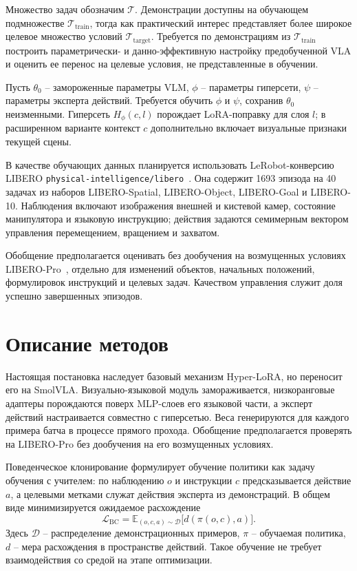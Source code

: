 \documentclass{misisarticle}
\begin{document}
Множество задач обозначим $\mathcal{T}$. Демонстрации доступны на обучающем подмножестве $\mathcal{T}_{\mathrm{train}}$, тогда как практический интерес представляет более широкое целевое множество условий $\mathcal{T}_{\mathrm{target}}$. Требуется по демонстрациям из $\mathcal{T}_{\mathrm{train}}$ построить параметрически- и данно-эффективную настройку предобученной VLA и оценить ее перенос на целевые условия, не представленные в обучении.

Пусть $\theta_0$ -- замороженные параметры VLM, $\phi$ -- параметры гиперсети, $\psi$ -- параметры эксперта действий. Требуется обучить $\phi$ и $\psi$, сохранив $\theta_0$ неизменными. Гиперсеть $H_\phi(c,l)$ порождает LoRA-поправку для слоя $l$; в расширенном варианте контекст $c$ дополнительно включает визуальные признаки текущей сцены.

В качестве обучающих данных планируется использовать LeRobot-конверсию LIBERO \texttt{physical-intelligence/libero}~\cite{libero,liberodata}. Она содержит 1693 эпизода на 40 задачах из наборов LIBERO-Spatial, LIBERO-Object, LIBERO-Goal и LIBERO-10. Наблюдения включают изображения внешней и кистевой камер, состояние манипулятора и языковую инструкцию; действия задаются семимерным вектором управления перемещением, вращением и захватом.

Обобщение предполагается оценивать без дообучения на возмущенных условиях LIBERO-Pro~\cite{liberopro}, отдельно для изменений объектов, начальных положений, формулировок инструкций и целевых задач. Качеством управления служит доля успешно завершенных эпизодов.

\section{Описание методов}

Настоящая постановка наследует базовый механизм Hyper-LoRA, но переносит его на SmolVLA. Визуально-языковой модуль замораживается, низкоранговые адаптеры порождаются поверх MLP-слоев его языковой части, а эксперт действий настраивается совместно с гиперсетью. Веса генерируются для каждого примера батча в процессе прямого прохода. Обобщение предполагается проверять на LIBERO-Pro без дообучения на его возмущенных условиях.

Поведенческое клонирование формулирует обучение политики как задачу обучения с учителем: по наблюдению $o$ и инструкции $c$ предсказывается действие $a$, а целевыми метками служат действия эксперта из демонстраций. В общем виде минимизируется ожидаемое расхождение
\begin{equation}
  \mathcal{L}_{\mathrm{BC}}=\mathbb{E}_{(o,c,a)\sim\mathcal{D}}
  \bigl[d(\pi(o,c),a)\bigr].
\end{equation}
Здесь $\mathcal{D}$ -- распределение демонстрационных примеров, $\pi$ -- обучаемая политика, $d$ -- мера расхождения в пространстве действий. Такое обучение не требует взаимодействия со средой на этапе оптимизации.
\end{document}
